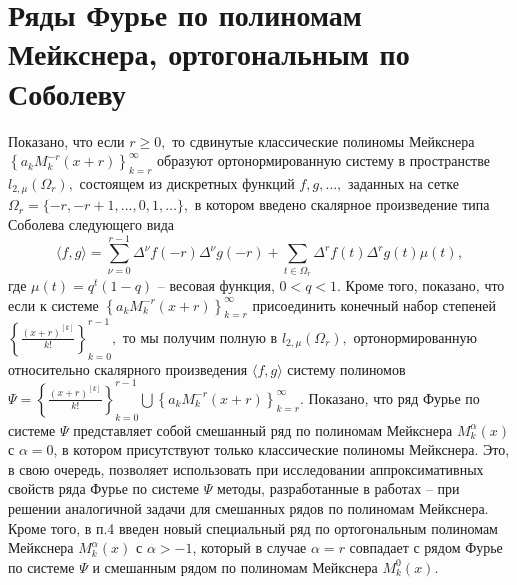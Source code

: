 \section{Ряды Фурье по полиномам Мейкснера, ортогональным по Соболеву}
Показано, что если $r\geq 0,$  то сдвинутые классические полиномы Мейкснера \linebreak $\left\{a_kM_k^{-r}(x+r)\right\}_{k=r}^\infty$ образуют ортонормированную систему в пространстве $l_{2,\mu}(\Omega_r),$  состоящем из дискретных функций $f,g, \ldots,$  заданных на сетке $\Omega_r=\{-r, -r+1, \ldots, 0, 1, \ldots\},$  в котором введено  скалярное произведение типа Соболева следующего вида
$$
\langle f,g \rangle=\sum_{\nu=0}^{r-1}\Delta^{\nu} f(-r)\Delta^{\nu} g(-r) + \sum_{t\in\Omega_r}\Delta^r f(t) \Delta^r g(t)\mu(t),
$$
где  $\mu(t)=q^t(1-q)$ -- весовая функция, $0<q<1.$  Кроме того, показано, что если к системе $\left\{a_kM_k^{-r}(x+r)\right\}_{k=r}^\infty$  присоединить конечный набор степеней $\left\{\frac{(x+r)^{[k]}}{k!}\right\}_{k=0}^{r-1},$ то мы получим полную в $l_{2,\mu}(\Omega_r),$  ортонормированную относительно скалярного произведения $\langle f,g \rangle$ систему полиномов $\Psi=\left\{\frac{(x+r)^{[k]}}{k!}\right\}_{k=0}^{r-1}\bigcup\left\{a_kM_k^{-r}(x+r)\right\}_{k=r}^\infty.$
Показано, что ряд Фурье по системе  $\Psi$ представляет собой смешанный ряд по полиномам Мейкснера $M_k^\alpha(x)$ с $\alpha=0$, в котором присутствуют только классические полиномы Мейкснера. Это, в свою очередь, позволяет использовать при исследовании аппроксимативных свойств ряда Фурье по системе $\Psi$  методы, разработанные в работах \cite{Ram14} -- \cite{Ram15} при решении аналогичной задачи для смешанных рядов по полиномам Мейкснера. Кроме того, в п.4 введен новый специальный ряд по ортогональным полиномам Мейкснера $M_k^{\alpha}(x)$ с $\alpha>-1$, который в случае $\alpha=r$  совпадает с рядом Фурье по системе $\Psi$  и смешанным рядом по полиномам Мейкснера $M_k^0(x)$.


%
%


